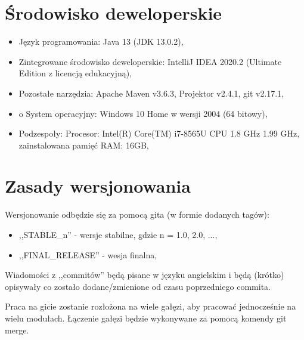 \documentclass{article}
\begin{document}
\section{Środowisko deweloperskie}
{\fontsize{13}{13}\selectfont
    
    \begin{itemize}
        \item Język programowania: Java 13 (JDK 13.0.2),
        \item Zintegrowane środowisko deweloperskie: IntelliJ IDEA 2020.2 (Ultimate Edition z licencją edukacyjną),
        \item Pozostałe narzędzia: Apache Maven v3.6.3, Projektor v2.4.1, git v2.17.1,
        \item o	System operacyjny: Windows 10 Home w wersji 2004 (64 bitowy),
        \item Podzespoły: Procesor: Intel(R) Core(TM) i7-8565U CPU 1.8 GHz 1.99 GHz, zainstalowana pamięć RAM: 16GB,

   
     \end{itemize}
    
 
}

    
\newpage

\section{Zasady wersjonowania}
{\fontsize{13}{13}\selectfont
    
    Wersjonowanie odbędzie się za pomocą gita (w formie dodanych tagów):

    \begin{itemize}
        \item ,,STABLE\_n'' - wersje stabilne, gdzie n = 1.0, 2.0, ...,
        \item,,FINAL\_RELEASE'' - wesja finalna,
    \end{itemize} 
    Wiadomości z ,,commitów'' będą pisane w języku angielskim i będą (krótko) opisywały co zostało dodane/zmienione od czasu poprzedniego commita. 
    
    Praca na gicie zostanie rozłożona na wiele gałęzi, aby pracować jednocześnie na wielu modułach. Łączenie gałęzi będzie wykonywane za pomocą komendy git merge.
}
\end{document}
